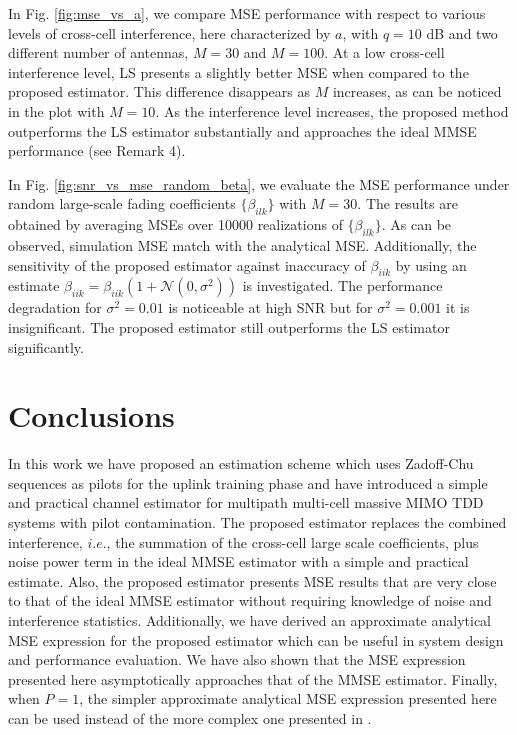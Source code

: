 \documentclass[10pt,journal,comsoc,final]{IEEEtran}
\begin{document}
In Fig. \ref{fig:mse_vs_a}, we compare MSE performance with respect to various levels of cross-cell interference, here characterized by $a$, with $q = 10$ dB and two different number of antennas, $M = 30$ and $M = 100$. At a low cross-cell interference level, LS presents a slightly better MSE when compared to the proposed estimator. This difference disappears as $M$ increases, as can be noticed in the plot with $M=10$. As the interference level increases, the proposed method outperforms the LS estimator substantially and approaches the ideal MMSE performance (see Remark 4).

In Fig. \ref{fig:snr_vs_mse_random_beta}, we evaluate the MSE performance under random large-scale fading coefficients $\{\beta_{ilk}\}$ with $M=30$. The results are obtained by averaging MSEs over 10000 realizations of $\{\beta_{ilk}\}$. As can be observed, simulation MSE match with the analytical MSE. Additionally, the sensitivity of the proposed estimator against inaccuracy of $\beta_{iik}$ by using an estimate $\beta_{iik} = \beta_{iik}(1 + \mathcal{N}(0,\sigma^{2}))$ is investigated. The performance degradation for $\sigma^{2} = 0.01$ is noticeable at high SNR but for $\sigma^{2} = 0.001$ it is insignificant. The proposed estimator still outperforms the LS estimator significantly.

\section{Conclusions}

In this work we have proposed an estimation scheme which uses Zadoff-Chu sequences as pilots for the uplink training phase and have introduced a simple and practical channel estimator for multipath multi-cell massive MIMO TDD systems with pilot contamination. The proposed estimator replaces the combined interference, $i.e.$, the summation of the cross-cell large scale coefficients, plus noise power term in the ideal MMSE estimator with a simple and practical estimate. Also, the proposed estimator presents MSE results that are very close to that of the ideal MMSE estimator without requiring knowledge of noise and interference statistics. Additionally, we have derived an approximate analytical MSE expression for the proposed estimator which can be useful in system design and performance evaluation. We have also shown that the MSE expression presented here asymptotically approaches that of the MMSE estimator. Finally, when $P = 1$, the simpler approximate analytical MSE expression presented here can be used instead of the more complex one presented in \cite{Amin:channelEstPilotCont}. 
\end{document}
